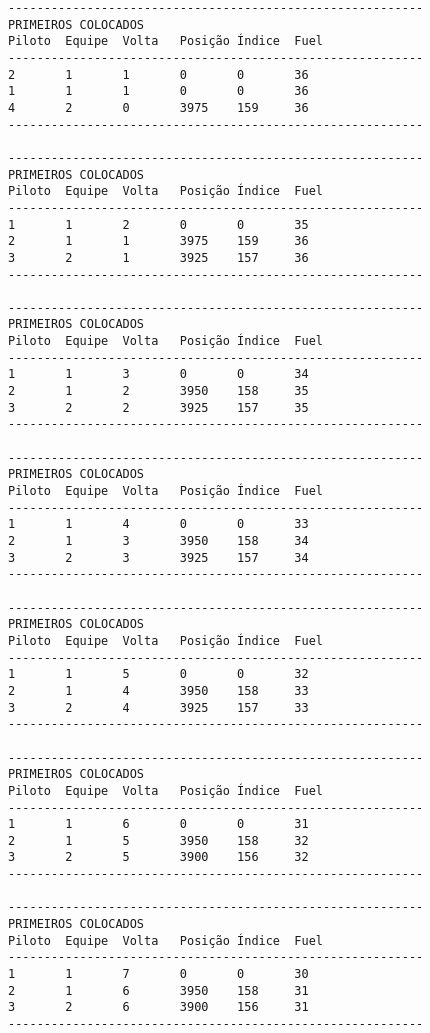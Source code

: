 \documentclass[12pt]{article}
\begin{document}
\begin{verbatim}
----------------------------------------------------------
PRIMEIROS COLOCADOS
Piloto  Equipe  Volta   Posição Índice  Fuel
----------------------------------------------------------
2       1       1       0       0       36
1       1       1       0       0       36
4       2       0       3975    159     36
----------------------------------------------------------

----------------------------------------------------------
PRIMEIROS COLOCADOS
Piloto  Equipe  Volta   Posição Índice  Fuel
----------------------------------------------------------
1       1       2       0       0       35
2       1       1       3975    159     36
3       2       1       3925    157     36
----------------------------------------------------------

----------------------------------------------------------
PRIMEIROS COLOCADOS
Piloto  Equipe  Volta   Posição Índice  Fuel
----------------------------------------------------------
1       1       3       0       0       34
2       1       2       3950    158     35
3       2       2       3925    157     35
----------------------------------------------------------

----------------------------------------------------------
PRIMEIROS COLOCADOS
Piloto  Equipe  Volta   Posição Índice  Fuel
----------------------------------------------------------
1       1       4       0       0       33
2       1       3       3950    158     34
3       2       3       3925    157     34
----------------------------------------------------------

----------------------------------------------------------
PRIMEIROS COLOCADOS
Piloto  Equipe  Volta   Posição Índice  Fuel
----------------------------------------------------------
1       1       5       0       0       32
2       1       4       3950    158     33
3       2       4       3925    157     33
----------------------------------------------------------

----------------------------------------------------------
PRIMEIROS COLOCADOS
Piloto  Equipe  Volta   Posição Índice  Fuel
----------------------------------------------------------
1       1       6       0       0       31
2       1       5       3950    158     32
3       2       5       3900    156     32
----------------------------------------------------------

----------------------------------------------------------
PRIMEIROS COLOCADOS
Piloto  Equipe  Volta   Posição Índice  Fuel
----------------------------------------------------------
1       1       7       0       0       30
2       1       6       3950    158     31
3       2       6       3900    156     31
----------------------------------------------------------


\end{verbatim}
\end{document}
